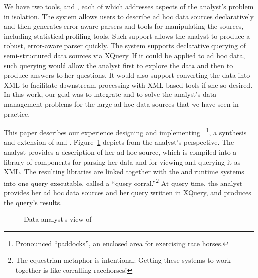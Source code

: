 
We have two tools, \pads{} and \Galax{}, each of which addresses aspects of the analyst's
problem in isolation.  The \pads{} system allows users to describe ad hoc data
sources declaratively and then generates error-aware parsers and tools
for manipulating the sources, including statistical profiling tools.
Such support allows the analyst to produce a robust, error-aware
parser quickly.  The \Galax{} system supports declarative querying of
semi-structured data sources via XQuery.  If it could be applied to ad
hoc data, such querying would allow the analyst first to explore the
data and then to produce answers to her questions.  It would also support
converting the data into XML to 
facilitate downstream processing with XML-based tools if she so
desired.  In this work, our goal was to integrate \pads{} and \Galax{}
to solve the analyst's data-management problems for the large ad hoc
data sources that we have seen in practice.

This paper describes our experience designing and implementing
\padx{}~\footnote{%
  Pronounced ``paddocks'', an enclosed area for exercising race
  horses.},
a synthesis and extension of \pads{} and 
\Galax{}.  Figure~\ref{figure:padx-arch1} depicts \padx{} from the
analyst's perspective.  The analyst provides a \pads{} description of
her ad hoc source, which is compiled into a library of components for
parsing her data and for viewing and querying it as XML.  The
resulting libraries are linked together with the \pads{} and \Galax{}
runtime systems into one \padx{} query executable, called a ``query
corral.''\footnote{%
   The equestrian metaphor is intentional: Getting these systems to
   work together is like corralling racehorses!}   
At query time, the analyst provides her ad hoc data sources and her query
written in XQuery, and \padx{} produces the query's results.
\begin{figure}
\begin{center}
\end{center}
\caption{Data analyst's view of \padx{}}
\label{figure:padx-arch1}
\end{figure}

